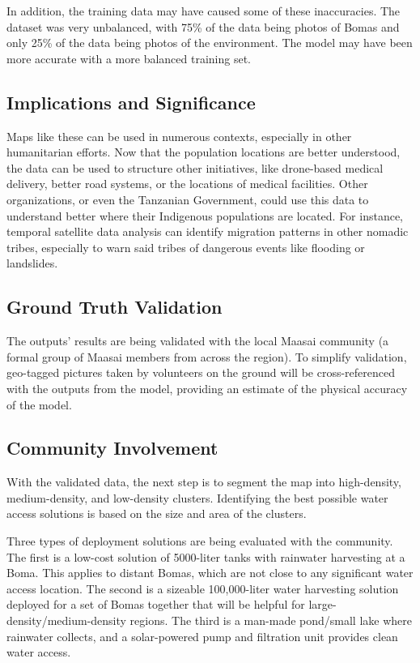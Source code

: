\documentclass[10pt]{article}
\begin{document}
In addition, the training data may have caused some of these inaccuracies. The dataset was very unbalanced, with 75\% of the data being photos of Bomas and only 25\% of the data being photos of the environment. The model may have been more accurate with a more balanced training set.

\subsection{Implications and Significance}

Maps like these can be used in numerous contexts, especially in other humanitarian efforts. Now that the population locations are better understood, the data can be used to structure other initiatives, like drone-based medical delivery, better road systems, or the locations of medical facilities. Other organizations, or even the Tanzanian Government, could use this data to understand better where their Indigenous populations are located. For instance, temporal satellite data analysis can identify migration patterns in other nomadic tribes, especially to warn said tribes of dangerous events like flooding or landslides.

\subsection{Ground Truth Validation}

The outputs' results are being validated with the local Maasai community (a formal group of Maasai members from across the region). To simplify validation, geo-tagged pictures taken by volunteers on the ground will be cross-referenced with the outputs from the model, providing an estimate of the physical accuracy of the model.

\subsection{Community Involvement}

With the validated data, the next step is to segment the map into high-density, medium-density, and low-density clusters. Identifying the best possible water access solutions is based on the size and area of the clusters.

Three types of deployment solutions are being evaluated with the community. The first is a low-cost solution of 5000-liter tanks with rainwater harvesting at a Boma. This applies to distant Bomas, which are not close to any significant water access location. The second is a sizeable 100,000-liter water harvesting solution deployed for a set of Bomas together that will be helpful for large-density/medium-density regions. The third is a man-made pond/small lake where rainwater collects, and a solar-powered pump and filtration unit provides clean water access.
\end{document}
